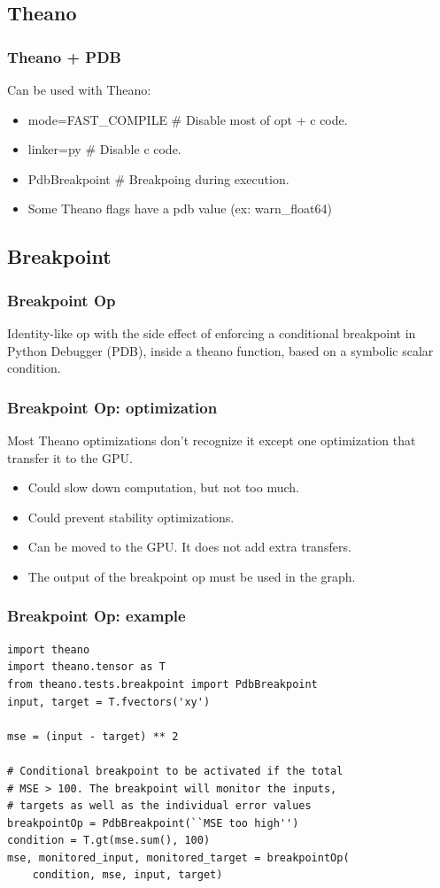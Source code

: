 \documentclass[utf8x,xcolor=pdftex,dvipsnames,table]{beamer}
\begin{document}
\subsection{Theano}
\begin{frame}
  \frametitle{Theano + PDB}
  Can be used with Theano:
  \begin{itemize}
    \item mode=FAST\_COMPILE \# Disable most of opt + c code.
    \item linker=py \# Disable c code.
    \item PdbBreakpoint \# Breakpoing during execution.
    \item Some Theano flags have a pdb value (ex: warn\_float64)
  \end{itemize}
\end{frame}



\subsection{Breakpoint}
\begin{frame}[fragile]
  \frametitle{Breakpoint Op} Identity-like op with the side effect of
  enforcing a conditional breakpoint in Python Debugger (PDB), inside a theano function, based
  on a symbolic scalar condition.
\end{frame}

\begin{frame}[fragile]
  \frametitle{Breakpoint Op: optimization}
 Most Theano optimizations don't recognize it except one
 optimization that transfer it to the GPU.
\begin{itemize}
  \item Could slow down computation, but not too much.
  \item Could prevent stability optimizations.
  \item Can be moved to the GPU. It does not add extra transfers.
  \item The output of the breakpoint op must be used in the graph.
\end{itemize}
\end{frame}

\begin{frame}[fragile]
  \frametitle{Breakpoint Op: example}
\begin{lstlisting}
import theano
import theano.tensor as T
from theano.tests.breakpoint import PdbBreakpoint
input, target = T.fvectors('xy')

mse = (input - target) ** 2

# Conditional breakpoint to be activated if the total
# MSE > 100. The breakpoint will monitor the inputs,
# targets as well as the individual error values
breakpointOp = PdbBreakpoint(``MSE too high'')
condition = T.gt(mse.sum(), 100)
mse, monitored_input, monitored_target = breakpointOp(
    condition, mse, input, target)
\end{lstlisting}
\end{frame}
\end{document}
